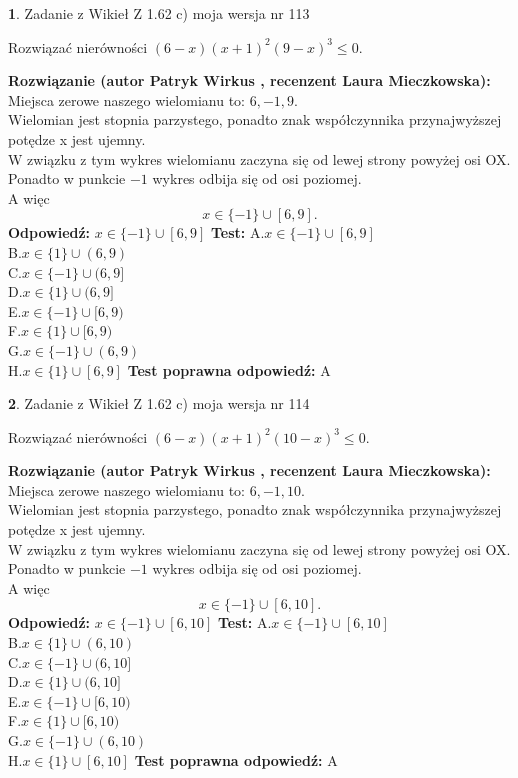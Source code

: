 \documentclass[12pt, a4paper]{article}
\theoremstyle{definition} %
\newtheorem{zad}{}
\newcommand{\zadStart}[1]{\begin{zad}#1\newline}
\newcommand{\zadStop}{\end{zad}}
\newcommand{\rozwStart}[2]{\noindent \textbf{Rozwiązanie (autor #1 , recenzent #2): }\newline}
\newcommand{\rozwStop}{\newline}
\newcommand{\odpStart}{\noindent \textbf{Odpowiedź:}\newline}
\newcommand{\odpStop}{\newline}
\newcommand{\testStart}{\noindent \textbf{Test:}\newline}
\newcommand{\testStop}{\newline}
\newcommand{\kluczStart}{\noindent \textbf{Test poprawna odpowiedź:}\newline}
\newcommand{\kluczStop}{\newline}
\begin{document}
\zadStart{Zadanie z Wikieł Z 1.62 c) moja wersja nr 113}

Rozwiązać nierówności $(6-x)(x+1)^{2}(9-x)^{3}\le0$.
\zadStop
\rozwStart{Patryk Wirkus}{Laura Mieczkowska}
Miejsca zerowe naszego wielomianu to: $6, -1, 9$.\\
Wielomian jest stopnia parzystego, ponadto znak współczynnika przy\linebreak najwyższej potędze x jest ujemny.\\ W związku z tym wykres wielomianu zaczyna się od lewej strony powyżej osi OX.\\
Ponadto w punkcie $-1$ wykres odbija się od osi poziomej.\\
A więc $$x \in \{-1\} \cup [6,9].$$
\rozwStop
\odpStart
$x \in \{-1\} \cup [6,9]$
\odpStop
\testStart
A.$x \in \{-1\} \cup [6,9]$\\
B.$x \in \{1\} \cup (6,9)$\\
C.$x \in \{-1\} \cup (6,9]$\\
D.$x \in \{1\} \cup (6,9]$\\
E.$x \in \{-1\} \cup [6,9)$\\
F.$x \in \{1\} \cup [6,9)$\\
G.$x \in \{-1\} \cup (6,9)$\\
H.$x \in \{1\} \cup [6,9]$
\testStop
\kluczStart
A
\kluczStop



\zadStart{Zadanie z Wikieł Z 1.62 c) moja wersja nr 114}

Rozwiązać nierówności $(6-x)(x+1)^{2}(10-x)^{3}\le0$.
\zadStop
\rozwStart{Patryk Wirkus}{Laura Mieczkowska}
Miejsca zerowe naszego wielomianu to: $6, -1, 10$.\\
Wielomian jest stopnia parzystego, ponadto znak współczynnika przy\linebreak najwyższej potędze x jest ujemny.\\ W związku z tym wykres wielomianu zaczyna się od lewej strony powyżej osi OX.\\
Ponadto w punkcie $-1$ wykres odbija się od osi poziomej.\\
A więc $$x \in \{-1\} \cup [6,10].$$
\rozwStop
\odpStart
$x \in \{-1\} \cup [6,10]$
\odpStop
\testStart
A.$x \in \{-1\} \cup [6,10]$\\
B.$x \in \{1\} \cup (6,10)$\\
C.$x \in \{-1\} \cup (6,10]$\\
D.$x \in \{1\} \cup (6,10]$\\
E.$x \in \{-1\} \cup [6,10)$\\
F.$x \in \{1\} \cup [6,10)$\\
G.$x \in \{-1\} \cup (6,10)$\\
H.$x \in \{1\} \cup [6,10]$
\testStop
\kluczStart
A
\kluczStop
\end{document}
